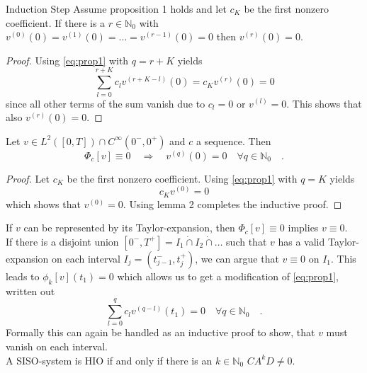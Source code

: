 \begin{lemma}{Induction Step}{}
	Assume proposition 1 holds and let $c_K$ be the first nonzero coefficient. 
	If there is a $r\in\mathbb{N}_0$ with $v^{(0)}(0)=
	v^{(1)}(0)=\ldots= v^{(r-1)}(0)=0$ then $v^{(r)}(0)=0$. 
\end{lemma}
\begin{proof}
	Using \eqref{eq:prop1} with $q = r+K$ yields 
	\begin{equation}
	\sum\limits_{l=0}^{r+K} c_l v^{(r+K-l)}(0) = c_K v^{(r)}(0) = 0
	\end{equation}
	since all other terms of the sum vanish due to $c_l=0$ or $v^{(l)}=0$. This shows 
	that also $v^{(r)}(0)=0$.
\end{proof}

\begin{theorem}{}{}
	Let $v\in L^2([0,T])\cap C^\infty(0^-,0^+)$ and $c$ a sequence. Then
	\begin{equation}
	\Phi_c[v] \equiv 0\quad  \Rightarrow\quad v^{(q)}(0) = 0
	 \quad \forall q\in\mathbb{N}_0 \quad .
	\end{equation}
\end{theorem}
\begin{proof}
	Let $c_K$ be the first nonzero coefficient. Using \eqref{eq:prop1} with $q=K$ yields 
	\begin{equation}
	c_K v^{(0)} = 0 
	\end{equation}
	which shows that $v^{(0)}=0$. Using lemma 2 completes the inductive proof.
\end{proof}

\begin{corollary}{}{}
	If $v$ can be represented by its Taylor-expansion, then $\Phi_c[v]\equiv 0$ implies 
	$v\equiv 0$.\\
	
	If there is a disjoint union $[0^-,T^+] = I_1\dot{\cap} I_2 \dot{\cap}\ldots$ such 
	that 
	$v$ has a valid Taylor-expansion on each interval $I_j=(t_{j-1}^-,t_j^+)$, we can argue 
	that $v\equiv 0$ on $I_1$. This leads to $\phi_k[v](t_1)=0$ which allows us to get 
	a modification of \eqref{eq:prop1}, written out
	\begin{equation}
	\sum\limits_{l=0}^q c_l v^{(q-l)}(t_1) = 0 \quad \forall q \in \mathbb{N}_0 \quad .
	\end{equation}
	Formally this can again be handled as an inductive proof to show, that $v$ must 
	vanish on each interval.\\
	
	A SISO-system is HIO if and only if there is an $k\in\mathbb{N}_0$  
	$CA^kD \neq 0$. 
\end{corollary}

